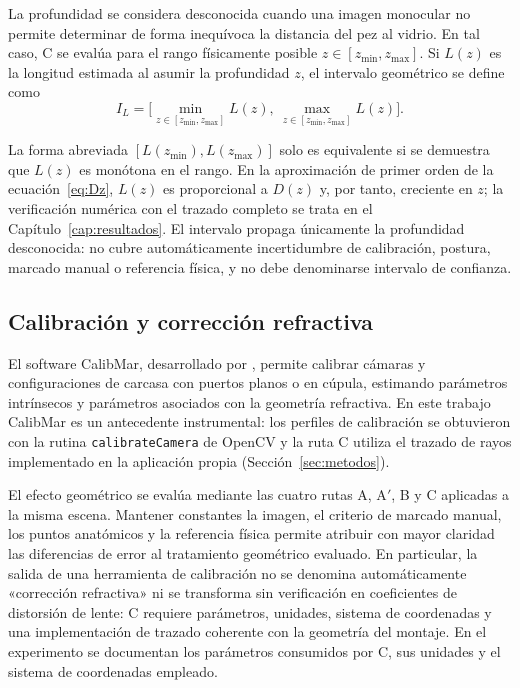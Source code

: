 \documentclass{report}
\newcommand{\Aprime}{A$'$}
\newcommand{\IL}{I_L}
\begin{document}
La profundidad se considera desconocida cuando una imagen monocular no permite determinar de forma inequívoca la distancia del pez al vidrio. En tal caso, C se evalúa para el rango físicamente posible $z \in [z_{\min}, z_{\max}]$. Si $L(z)$ es la longitud estimada al asumir la profundidad $z$, el intervalo geométrico se define como
\begin{equation}
\IL = \Big[\min_{z \in [z_{\min}, z_{\max}]} L(z),\ \max_{z \in [z_{\min}, z_{\max}]} L(z)\Big].
\label{eq:IL}
\end{equation}

La forma abreviada $[L(z_{\min}), L(z_{\max})]$ solo es equivalente si se demuestra que $L(z)$ es monótona en el rango. En la aproximación de primer orden de la ecuación~\eqref{eq:Dz}, $L(z)$ es proporcional a $D(z)$ y, por tanto, creciente en $z$; la verificación numérica con el trazado completo se trata en el Capítulo~\ref{cap:resultados}. El intervalo propaga únicamente la profundidad desconocida: no cubre automáticamente incertidumbre de calibración, postura, marcado manual o referencia física, y no debe denominarse intervalo de confianza.

\subsection{Calibración y corrección refractiva}

El software CalibMar, desarrollado por \textcite{Seegraber2025}, permite calibrar cámaras y configuraciones de carcasa con puertos planos o en cúpula, estimando parámetros intrínsecos y parámetros asociados con la geometría refractiva. En este trabajo CalibMar es un antecedente instrumental: los perfiles de calibración se obtuvieron con la rutina \texttt{calibrateCamera} de OpenCV \parencite{Zhang2000} y la ruta C utiliza el trazado de rayos implementado en la aplicación propia (Sección~\ref{sec:metodos}).

El efecto geométrico se evalúa mediante las cuatro rutas A, \Aprime, B y C aplicadas a la misma escena. Mantener constantes la imagen, el criterio de marcado manual, los puntos anatómicos y la referencia física permite atribuir con mayor claridad las diferencias de error al tratamiento geométrico evaluado. En particular, la salida de una herramienta de calibración no se denomina automáticamente «corrección refractiva» ni se transforma sin verificación en coeficientes de distorsión de lente: C requiere parámetros, unidades, sistema de coordenadas y una implementación de trazado coherente con la geometría del montaje. En el experimento se documentan los parámetros consumidos por C, sus unidades y el sistema de coordenadas empleado.
\end{document}
